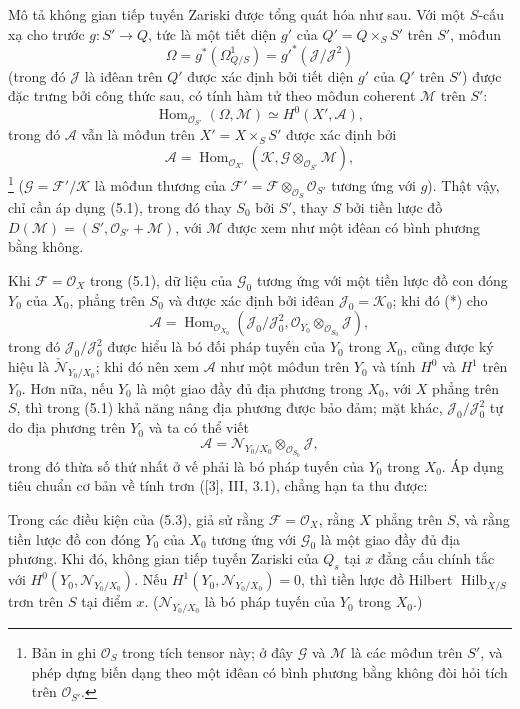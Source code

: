 Mô tả không gian tiếp tuyến Zariski được tổng quát hóa như sau. Với một
$S$-cấu xạ cho trước $g:S'\longrightarrow Q$, tức là một tiết diện $g'$ của
$Q'=Q\times_SS'$ trên $S'$, môđun
\[
\Omega=g^*(\Omega^1_{Q/S})=g'^*(\mathcal J/\mathcal J^2)
\]
(trong đó $\mathcal J$ là iđêan trên $Q'$ được xác định bởi tiết diện $g'$ của
$Q'$ trên $S'$) được đặc trưng bởi công thức sau, có tính hàm tử theo môđun coherent
$\mathcal M$ trên $S'$:
\[
\operatorname{Hom}_{\mathcal O_{S'}}(\Omega,\mathcal M)
\simeq H^0(X',\mathcal A),
\]
trong đó $\mathcal A$ vẫn là môđun trên $X'=X\times_SS'$ được xác định bởi
\[
\mathcal A=\operatorname{Hom}_{\mathcal O_{X'}}
(\mathcal K,\mathcal G\otimes_{\mathcal O_{S'}}\mathcal M),
\]
\footnote{Bản in ghi $\mathcal O_S$ trong tích tensor này; ở đây $\mathcal G$
và $\mathcal M$ là các môđun trên $S'$, và phép dựng biến dạng theo một iđêan
có bình phương bằng không đòi hỏi tích trên $\mathcal O_{S'}$.}
($\mathcal G=\mathcal F'/\mathcal K$ là môđun thương của
$\mathcal F'=\mathcal F\otimes_{\mathcal O_S}\mathcal O_{S'}$ tương ứng với
$g$). Thật vậy, chỉ cần áp dụng (5.1), trong đó thay $S_0$ bởi $S'$, thay $S$
bởi tiền lược đồ $D(\mathcal M)=(S',\mathcal O_{S'}+\mathcal M)$, với
$\mathcal M$ được xem như một iđêan có bình phương bằng không.

Khi $\mathcal F=\mathcal O_X$ trong (5.1), dữ liệu của
$\mathcal G_0$ tương ứng với một tiền lược đồ con đóng $Y_0$ của
$X_0$, phẳng trên $S_0$ và được xác định bởi iđêan
$\mathcal J_0=\mathcal K_0$; khi đó (*) cho
\[
\mathcal A=\operatorname{Hom}_{\mathcal O_{X_0}}
(\mathcal J_0/\mathcal J_0^2,
\mathcal O_{Y_0}\otimes_{\mathcal O_{S_0}}\mathcal J),
\]
trong đó $\mathcal J_0/\mathcal J_0^2$ được hiểu là bó đối pháp tuyến của $Y_0$
trong $X_0$, cũng được ký hiệu là
$\check{\mathcal N}_{Y_0/X_0}$; khi đó nên xem $\mathcal A$ như một môđun
trên $Y_0$ và tính $H^0$ và $H^1$ trên $Y_0$. Hơn nữa, nếu $Y_0$ là một giao
đầy đủ địa phương trong $X_0$, với $X$ phẳng trên $S$, thì trong (5.1) khả
năng nâng địa phương được bảo đảm; mặt khác,
$\mathcal J_0/\mathcal J_0^2$ tự do địa phương trên $Y_0$ và ta có thể viết
\[
\mathcal A=\mathcal N_{Y_0/X_0}\otimes_{\mathcal O_{S_0}}\mathcal J,
\]
trong đó thừa số thứ nhất ở vế phải là bó pháp tuyến của $Y_0$ trong $X_0$.
Áp dụng tiêu chuẩn cơ bản về tính trơn ([3], III, 3.1), chẳng hạn ta thu được:

 Trong các điều kiện của (5.3), giả sử rằng
$\mathcal F=\mathcal O_X$, rằng $X$ phẳng trên $S$, và rằng tiền lược đồ con
đóng $Y_0$ của $X_0$ tương ứng với $\mathcal G_0$ là một giao đầy đủ địa
phương. Khi đó, không gian tiếp tuyến Zariski của $Q_s$ tại $x$ đẳng cấu chính
tắc với $H^0(Y_0,\mathcal N_{Y_0/X_0})$. Nếu
$H^1(Y_0,\mathcal N_{Y_0/X_0})=0$, thì tiền lược đồ Hilbert
$\operatorname{Hilb}_{X/S}$ trơn trên $S$ tại điểm $x$.
($\mathcal N_{Y_0/X_0}$ là bó pháp tuyến của $Y_0$ trong $X_0$.)

